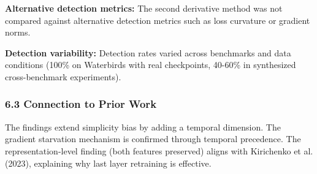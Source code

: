 \textbf{Alternative detection metrics:} The second derivative method was not compared against alternative detection metrics such as loss curvature or gradient norms.

\textbf{Detection variability:} Detection rates varied across benchmarks and data conditions (100\% on Waterbirds with real checkpoints, 40-60\% in synthesized cross-benchmark experiments).

\subsubsection{6.3 Connection to Prior Work}

The findings extend simplicity bias \citep{shah2020simplicity} by adding a temporal dimension. The gradient starvation mechanism \citep{pezeshki2021gradient} is confirmed through temporal precedence. The representation-level finding (both features preserved) aligns with Kirichenko et al. (2023), explaining why last layer retraining is effective.

